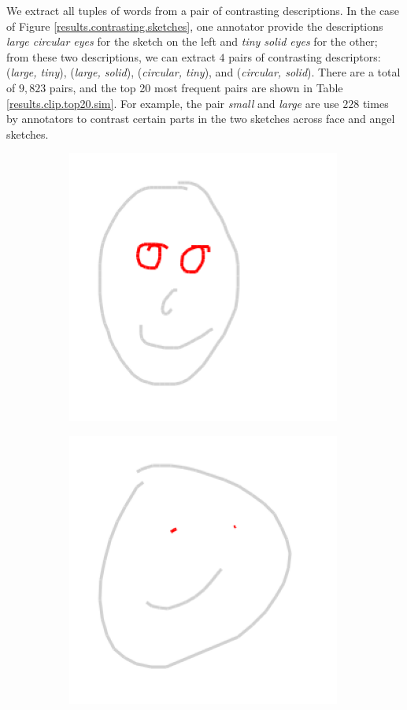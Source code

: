 We extract all tuples of words from a pair of contrasting descriptions. In the case of Figure \ref{results.contrasting.sketches}, one annotator provide the descriptions \textit{large circular eyes} for the sketch on the left and \textit{tiny solid eyes} for the other; from these two descriptions, we can extract $4$ pairs of contrasting descriptors: (\textit{large, tiny}), (\textit{large, solid}), (\textit{circular, tiny}), and (\textit{circular, solid}). There are a total of $9,823$ pairs, and the top 20 most frequent pairs are shown in Table \ref{results.clip.top20.sim}. For example, the pair \textit{small} and \textit{large} are use $228$ times by annotators to contrast certain parts in the two sketches across face and angel sketches. 
\begin{figure}[!h]
\begin{subfigure}{0.5\textwidth}
    \centering
    \includegraphics[width=0.5\linewidth]{results/contrasting_pair2_color_19.png}  
\end{subfigure}
\begin{subfigure}{0.5\textwidth}
    \centering
    \includegraphics[width=0.5\linewidth]{results/contrasting_pair2_color_102.png}   

\end{subfigure}
\end{figure}
